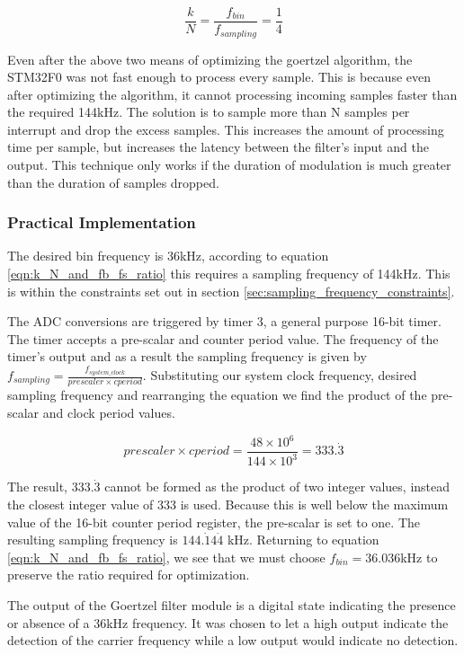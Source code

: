 \begin{equation}
\label{eqn:k_N_and_fb_fs_ratio}
\frac{k}{N} = \frac{f_{bin}}{f_{sampling}} = \frac{1}{4}
\end{equation}

Even after the above two means of optimizing the goertzel algorithm, the STM32F0 was not fast enough to process every sample. This is because even after optimizing the algorithm, it cannot processing incoming samples faster than the required 144kHz. The solution is to sample more than N samples per interrupt and drop the excess samples. This increases the amount of processing time per sample, but increases the latency between the filter's input and the output. This technique only works if the duration of modulation is much greater than the duration of samples dropped.

\subsubsection{Practical Implementation}

The desired bin frequency is 36kHz, according to equation \ref{eqn:k_N_and_fb_fs_ratio} this requires a sampling frequency of 144kHz. This is within the constraints set out in section \ref{sec:sampling_frequency_constraints}.

The ADC conversions are triggered by timer 3, a general purpose 16-bit timer. The timer accepts a pre-scalar and counter period value. The frequency of the timer's output and as a result the sampling frequency is given by \(f_{sampling} = \frac{f_{system\_clock}}{prescaler \times cperiod}\). Substituting our system clock frequency, desired sampling frequency and rearranging the equation we find the product of the pre-scalar and clock period values.

\[prescaler \times cperiod = \frac{48 \times 10^6}{144 \times 10^3} = 333.\dot{3}\]

The result, $333.\dot{3}$ cannot be formed as the product of two integer values, instead the closest integer value of 333 is used. Because this is well below the maximum value of the 16-bit counter period register, the pre-scalar is set to one. The resulting sampling frequency is $144.\dot{1}4\dot{4}$ kHz. Returning to equation \ref{eqn:k_N_and_fb_fs_ratio}, we see that we must choose $f_{bin} = 36.036$kHz to preserve the ratio required for optimization.

The output of the Goertzel filter module is a digital state indicating the presence or absence of a 36kHz frequency. It was chosen to let a high output indicate the detection of the carrier frequency while a low output would indicate no detection.

